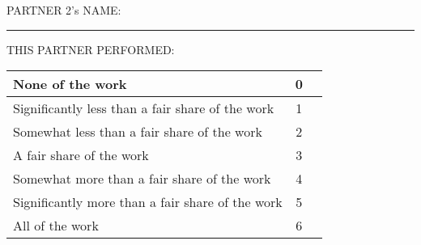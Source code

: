 \documentclass[11pt]{article}
\begin{document}
PARTNER 2's NAME: \rule[-1pt]{4in}{.5pt}

THIS PARTNER PERFORMED:

\begin{tabular}{|l|c|p{.5in}|}
\hline
None of the work&0&\\
\hline
Significantly less than a fair share of the work&1&\\
\hline
Somewhat less than a fair share of the work&2&\\
\hline
A fair share of the work&3&\\
\hline
Somewhat more than a fair share of the work&4&\\
\hline
Significantly more than a fair share of the work&5&\\
\hline
All of the work&6&\\
\hline
\end{tabular}
\end{document}
